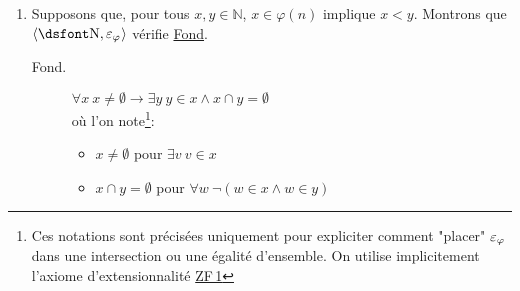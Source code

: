 \documentclass{../notes}
\newcommand\zf[1]{\hyperref[ZF#1]{\textsf{ZF\,#1}}}
\newcommand\fond{\hyperref[FOND]{\textsf{Fond}}}
\newcommand\inphi[1][\relax]{\ensuremath{\mathrel{\varepsilon_{\varphi_{#1}}}}}
\begin{document}
\begin{enumerate}
\begin{description}
          Soit $\psi$ une formule à $n+2$ paramètres.
          Soient $v_1, \ldots, v_n$ et supposons $\psi$ fonctionnelle en son premier paramètre.
          Soit $u \in \mathds{N}$.
          De par cette hypothèse de relation fonctionnelle, pour tout $x \in \varphi(u)$, il existe au plus un entier $w$ tel que $\varphi(x, w, v_1, \ldots, v_n)$ soit vraie.
          Ainsi l'ensemble \[
            V := \mleft\{\,w \in \mathds{N} \;\middle|\; \exists x \in \varphi(u), \psi(x, w, v_1, \ldots, v_n) \text{ vraie}\,\mright\} 
          \] est fini (car cardinal majoré par $\#\varphi(u)$, fini).
          Il existe donc un entier $v \in \mathds{N}$ tel que $\varphi(v) = V$ (par surjectivité de $\varphi$).
          Soit $w \in \mathds{N}$.
          On a la chaîne d'équivalences suivante :
          \begin{align*}
            \hspace{-7em}
            w \inphi v & \text{ ssi } w \in \varphi(v) = V && \text{ par déf. de $\inphi$ et $v$ }\\
                       & \text{ ssi } \exists x \in \varphi(u), \psi(x, w, v_1, \ldots, v_n) \text{ vraie } && \text{ par déf. de $V$ }\\
                       & \text{ ssi } \exists x \in \mathds{N}, x \inphi u \text{ et } \psi(x, w, v_1, \ldots, v_n) &&\text{ par déf. de $\inphi$}
          .\end{align*}
          D'où \zf 4 est vérifié par l'univers $\langle \mathds{N}, \inphi \rangle$.
      \end{description}
    \item \label{ex1q2} Supposons que, pour tous $x, y \in \mathds{N}$, $x \in \varphi(n)$ implique $x < y$.
      Montrons que $\langle \mathds{N}, {\inphi}\rangle$ vérifie \fond.
      \begin{description}
        \item[Fond.]\label{FOND}
          $\forall x \: x \neq \emptyset \to \exists y \: y \in x \land x \cap y = \emptyset$\\
          où l'on note\footnote{Ces notations sont précisées uniquement pour expliciter comment "placer" $\inphi$ dans une intersection ou une égalité d'ensemble. On utilise implicitement l'axiome d'extensionnalité \zf 1}\showfootnote :
          \begin{itemize}
            \item $x \neq \emptyset$ pour $\exists v \: v \in x$
            \item $x \cap y = \emptyset$ pour $\forall w \: \lnot (w \in x \land w \in y)$
          \end{itemize}


\end{description}
\end{enumerate}
\end{document}
